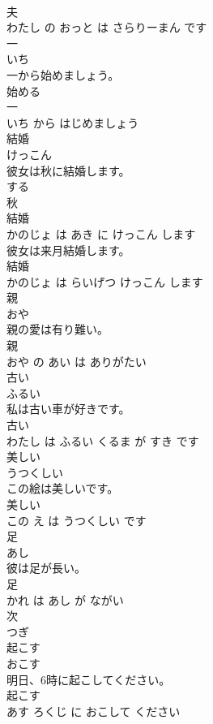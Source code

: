 \documentclass[8pt]{extreport}
\begin{document}
\begin{CJK}{UTF8}{min}
\\	夫 
\\	わたし の おっと は さらりーまん です			
\\	一	
\\	いち			
\\	一から始めましょう。	
\\	始める 
\\	一 
\\	いち から はじめましょう			
\\	結婚	
\\	けっこん			
\\	彼女は秋に結婚します。	
\\	する 
\\	秋 
\\	結婚 
\\	かのじょ は あき に けっこん します			
\\	彼女は来月結婚します。	
\\	結婚 
\\	かのじょ は らいげつ けっこん します			
\\	親	
\\	おや			
\\	親の愛は有り難い。	
\\	親 
\\	おや の あい は ありがたい			
\\	古い	
\\	ふるい			
\\	私は古い車が好きです。	
\\	古い 
\\	わたし は ふるい くるま が すき です			
\\	美しい	
\\	うつくしい			
\\	この絵は美しいです。	
\\	美しい 
\\	この え は うつくしい です			
\\	足	
\\	あし			
\\	彼は足が長い。	
\\	足 
\\	かれ は あし が ながい			
\\	次	
\\	つぎ			
\\	起こす	
\\	おこす			
\\	明日、6時に起こしてください。	
\\	起こす 
\\	あす ろくじ に おこして ください			

\end{CJK}
\end{document}
